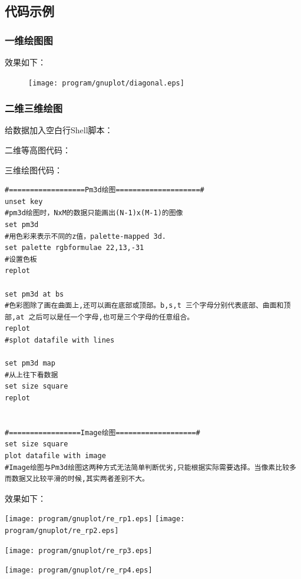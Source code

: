 \subsection{代码示例}
\subsubsection{一维绘图图}

效果如下：
\begin{figure}[htb]
\centering
\texttt{[image: program/gnuplot/diagonal.eps]}
\end{figure}



\subsubsection{二维三维绘图}
给数据加入空白行Shell脚本：

二维等高图代码：

三维绘图代码：
\begin{lstlisting}[language=gnuplot]
#==================Pm3d绘图====================#
unset key
#pm3d绘图时，NxM的数据只能画出(N-1)x(M-1)的图像
set pm3d
#用色彩来表示不同的z值，palette-mapped 3d.
set palette rgbformulae 22,13,-31
#设置色板
replot

set pm3d at bs
#色彩图除了画在曲面上,还可以画在底部或顶部。b,s,t 三个字母分别代表底部、曲面和顶部,at 之后可以是任一个字母,也可是三个字母的任意组合。
replot
#splot datafile with lines

set pm3d map
#从上往下看数据
set size square
replot


#=================Image绘图===================#
set size square
plot datafile with image
#Image绘图与Pm3d绘图这两种方式无法简单判断优劣,只能根据实际需要选择。当像素比较多而数据又比较平滑的时候,其实两者差别不大。
\end{lstlisting}


效果如下：

\texttt{[image: program/gnuplot/re\_rp1.eps]}
\texttt{[image: program/gnuplot/re\_rp2.eps]}

\texttt{[image: program/gnuplot/re\_rp3.eps]}

\texttt{[image: program/gnuplot/re\_rp4.eps]}







